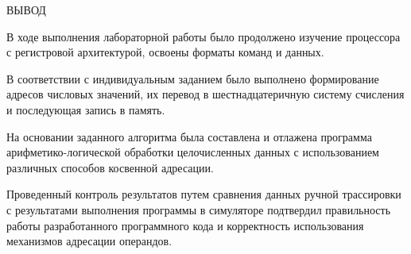 \begin{center}
    ВЫВОД
\end{center}

В ходе выполнения лабораторной работы было продолжено изучение процессора с регистровой архитектурой, 
освоены форматы команд и данных. 

В соответствии с индивидуальным заданием было выполнено формирование адресов числовых значений, 
их перевод в шестнадцатеричную систему счисления и последующая запись в память. 

На основании заданного алгоритма была составлена и отлажена программа арифметико-логической 
обработки целочисленных данных с использованием различных способов косвенной адресации. 

Проведенный контроль результатов путем сравнения данных ручной трассировки с результатами выполнения программы 
в симуляторе подтвердил правильность работы разработанного программного кода и корректность использования механизмов адресации операндов.